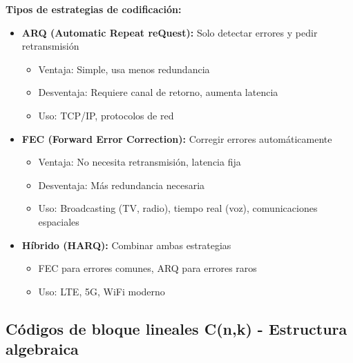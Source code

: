 \documentclass[10pt,a4paper]{article}
\begin{document}
\textbf{Tipos de estrategias de codificación:}
\begin{itemize}
\item \textbf{ARQ (Automatic Repeat reQuest):} Solo detectar errores y pedir retransmisión
  \begin{itemize}
  \item Ventaja: Simple, usa menos redundancia
  \item Desventaja: Requiere canal de retorno, aumenta latencia
  \item Uso: TCP/IP, protocolos de red
  \end{itemize}
\item \textbf{FEC (Forward Error Correction):} Corregir errores automáticamente
  \begin{itemize}
  \item Ventaja: No necesita retransmisión, latencia fija
  \item Desventaja: Más redundancia necesaria
  \item Uso: Broadcasting (TV, radio), tiempo real (voz), comunicaciones espaciales
  \end{itemize}
\item \textbf{Híbrido (HARQ):} Combinar ambas estrategias
  \begin{itemize}
  \item FEC para errores comunes, ARQ para errores raros
  \item Uso: LTE, 5G, WiFi moderno
  \end{itemize}
\end{itemize}

\subsection{Códigos de bloque lineales C(n,k) - Estructura algebraica}
\end{document}
